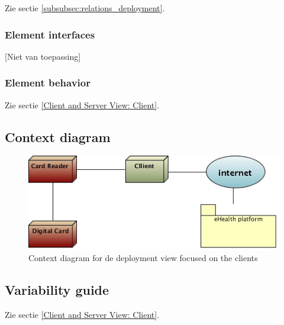 \documentclass[a4paper,10pt]{article}
\begin{document}
Zie sectie \ref{subsubsec:relations_deployment}.

\subsubsection{Element interfaces}

[Niet van toepassing]

\subsubsection{Element behavior}

Zie sectie \ref{Client and Server View: Client}.
\clearpage
\subsection{Context diagram}

\begin{center}
    \begin{figure}[!h]
      \includegraphics[width=\textwidth]{../images/deployment_clients_context.jpg}
	\caption{Context diagram for de deployment view focused on the clients}
    \end{figure}
  \end{center}

\subsection{Variability guide}
Zie sectie \ref{Client and Server View: Client}.
\end{document}
